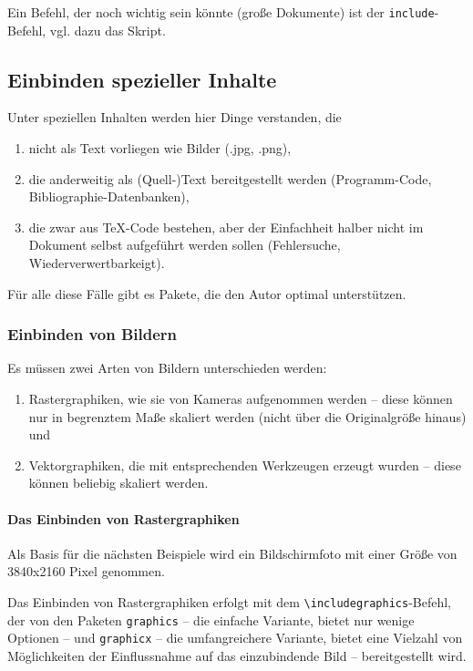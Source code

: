 Ein Befehl, der noch wichtig sein könnte (große Dokumente) ist der
\lstinline|include|-Befehl, vgl. dazu das Skript.

\subsection{Einbinden spezieller Inhalte}

Unter speziellen Inhalten werden hier Dinge verstanden, die
\begin{enumerate}
  \item nicht als Text vorliegen wie Bilder (.jpg, .png),
  \item die anderweitig als (Quell-)Text bereitgestellt werden
    (Programm-Code, Bibliographie-Datenbanken),
  \item die zwar aus \TeX-Code bestehen, aber der Einfachheit halber
    nicht im Dokument selbst aufgeführt werden sollen (Fehlersuche,
    Wiederverwertbarkeigt).
\end{enumerate}
Für alle diese Fälle gibt es Pakete, die den Autor optimal unterstützen.

\subsubsection{Einbinden von Bildern}

Es müssen zwei Arten von Bildern unterschieden werden:
\begin{enumerate}
  \item Rastergraphiken, wie sie von Kameras aufgenommen werden -- diese
    können nur in begrenztem Maße skaliert werden (nicht über die
    Originalgröße hinaus) und
  \item Vektorgraphiken, die mit entsprechenden Werkzeugen erzeugt wurden
    -- diese können beliebig skaliert werden.
\end{enumerate}

\paragraph{Das Einbinden von Rastergraphiken}

Als Basis für die nächsten Beispiele wird ein Bildschirmfoto mit einer
Größe von 3840x2160 Pixel genommen.

Das Einbinden von Rastergraphiken erfolgt mit dem
\lstinline|\includegraphics|-Befehl, der von den Paketen \texttt{graphics}
-- die einfache Variante, bietet nur wenige Optionen -- und
\texttt{graphicx} -- die umfangreichere Variante, bietet eine Vielzahl von
Möglichkeiten der Einflussnahme auf das einzubindende Bild --
bereitgestellt wird.

